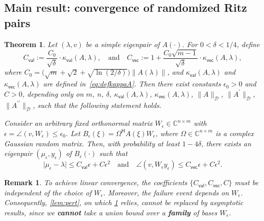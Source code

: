 \documentclass[a4paper,11pt]{article}
\newtheorem{remark}{Remark}
\newtheorem{theorem}{Theorem}
\newcommand{\Htran}{\mathsf{H}}
\newcommand{\defi}{:=}
\newcommand{\C}{\mathbb{C}}
\newcommand{\region}{\mathcal{D}}
\newcommand{\Crval}{C_{\mathsf{val}}}
\newcommand{\Crvec}{C_{\mathsf{vec}}}
\newcommand{\kval}{\kappa_{\mathsf{val}}}
\newcommand{\kvec}{\kappa_{\mathsf{vec}}}
\providecommand{\abs}[1]{\lvert#1\rvert}
\providecommand{\norm}[1]{\lVert#1\rVert}
\begin{document}
\subsection{Main result: convergence of randomized Ritz pairs}
\begin{theorem}
\label{thm:ritzpair}
Let $(\lambda,v)$ be a simple eigenpair of $A(\cdot)$.
For $0<\delta<1/4$, define
\begin{equation}
    \label{eq:defCr}
\Crval \defi 
\frac{C_{0}}{\sqrt{\delta}}
\cdot \kval(A,\lambda),
\quad\text{and}\quad 
\Crvec \defi  
1 + \frac{C_{0}\sqrt{m-1}}{\sqrt{\delta}}
\cdot \kvec(A,\lambda),
\end{equation}
where $C_{0}=\bigl(\sqrt{m}+\sqrt{2}+\sqrt{\ln(2/\delta)}\bigr)\norm{A(\lambda)}$, and $\kval(A,\lambda)$ and $\kvec(A,\lambda)$ are defined in~\cref{eq:defkappaA}.
Then there exist constants $\epsilon_{0}>0$ and $C>0$, depending only on $m$, $n$, $\delta$, $\kval(A,\lambda)$, $\kvec(A,\lambda)$, $\norm{A}_{\region}$, $\norm{A^{\prime}}_{\region}$, $\norm{A^{\prime\prime}}_{\region}$,
such that the following statement holds. 


Consider an arbitrary fixed orthonormal matrix $W_{\epsilon}\in\C^{n\times m}$ with $\epsilon=\angle(v,W_{\epsilon})\leq \epsilon_{0}$.
Let $B_{\epsilon}(\xi)=\Omega^{\Htran}A(\xi)W_{\epsilon}$, where $\Omega\in\C^{n\times m}$ is a complex Gaussian random matrix. Then, with probability at least $1-4\delta$, there exists an eigenpair $(\mu_{\epsilon},y_{\epsilon})$ of $B_{\epsilon}(\cdot)$ such that
\begin{equation}
    \label{eq:convRRR}
    \abs{\mu_{\epsilon}-\lambda} \leq \Crval\epsilon + C\epsilon^{2}
    \quad\text{and}\quad
    \angle(v,W_{\epsilon}y_{\epsilon}) \leq \Crvec\epsilon+ C\epsilon^{2}.
\end{equation}
\end{theorem}


\begin{remark}
    \label{rmk:nonasymptotic}
To achieve linear convergence, the coefficients $\{\Crval,\Crvec,C\}$ must be independent of the choice of $W_{\epsilon}$. Moreover, the failure event depends on $W_{\epsilon}$. Consequently, \cref{lem:pert}, on which \cref{thm:ritzpair} relies, cannot be replaced by asymptotic results, since we \textbf{cannot} take a union bound over a \textbf{family} of bases $W_{\epsilon}$.
\end{remark}
\end{document}
